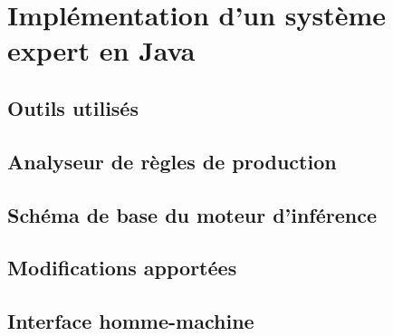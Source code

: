 \chapter{Implémentation d'un système expert en Java}
\section{Outils utilisés}
\section{Analyseur de règles de production}
\section{Schéma de base du moteur d'inférence}
\section{Modifications apportées}
\section{Interface homme-machine}
